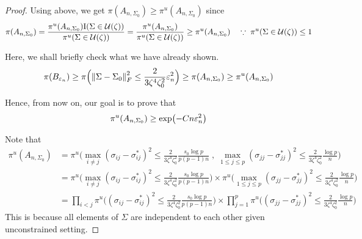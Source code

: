 \begin{proof}
    Using above, we get $\pi(A_{n, \Sigma_0})\geq \pi^u(A_{n, \Sigma_0})$ since \[\pi(A_{n, \Sigma_0}) = \frac{\pi^u(A_{n, \Sigma_0})\text{I}(\Sigma\in \mathcal{U}(\zeta))}{\pi^u(\Sigma\in \mathcal{U}(\zeta))} = \frac{\pi^u(A_{n, \Sigma_0})}{\pi^u(\Sigma\in \mathcal{U}(\zeta))} \geq \pi^u(A_{n, \Sigma_0}) \quad \because \; \pi^u(\Sigma \in \mathcal{U}(\zeta))\leq 1\]

    Here, we shall briefly check what we have already shown. 
    \[\pi(B_{\varepsilon_n}) \geq \pi\Big(\norm{\Sigma- \Sigma_0}_F^2 \leq \frac{2}{3\zeta^4\zeta_0^2}\varepsilon_n^2\Big) \geq \pi(A_{n, \Sigma_0})\geq \pi^u(A_{n, \Sigma_0}) \]

    Hence, from now on, our goal is to prove that \[\pi^u(A_{n, \Sigma_0})\geq \exp(-Cn\varepsilon_n^2)\]

    Note that
    \begin{align*}
        \pi^u(A_{n, \Sigma_0}) &= \pi^u\Big(\max_{i\neq j}(\sigma_{ij}- \sigma_{ij}^*)^2\leq \frac{2}{3\zeta^4\zeta_0^2}\frac{s_0\log p}{p(p-1)n} \;,\; \max_{1\leq j\leq p}(\sigma_{jj}- \sigma_{jj}^*)^2 \leq \frac{2}{3\zeta^4 \zeta_0^2}\frac{\log p}{n}\Big) \\
        &= \pi^u\Big(\max_{i\neq j}(\sigma_{ij}- \sigma_{ij}^*)^2\leq \frac{2}{3\zeta^4\zeta_0^2}\frac{s_0\log p}{p(p-1)n}\Big) \times \pi^u\Big(\max_{1\leq j\leq p}(\sigma_{jj}- \sigma_{jj}^*)^2 \leq \frac{2}{3\zeta^4 \zeta_0^2}\frac{\log p}{n} \Big) \\
        &= \prod_{i < j} \pi^u\Big((\sigma_{ij}- \sigma_{ij}^*)^2\leq \frac{2}{3\zeta^4\zeta_0^2}\frac{s_0\log p}{p(p-1)n} \Big) \times \prod_{j=1}^p \pi^u\Big((\sigma_{jj}- \sigma_{jj}^*)^2 \leq \frac{2}{3\zeta^4 \zeta_0^2}\frac{\log p}{n} \Big)
    \end{align*}
    This is because all elements of $\Sigma$ are independent to each other given unconstrained setting. 


\end{proof}
